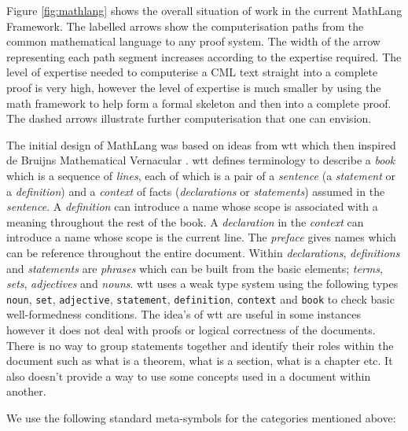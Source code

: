 Figure \ref{fig:mathlang} shows the overall situation of work in the current
MathLang Framework. The labelled arrows show the computerisation paths from the
common mathematical language to any proof system. The width of the arrow
representing each path segment increases according to the expertise required.
The level of expertise needed to computerise a CML text straight into a complete
proof is very high, however the level of expertise is much smaller by using the
\gls{math} framework to help form a formal skeleton and then into a complete
proof. The dashed arrows illustrate further computerisation that one can
envision.

The initial design of MathLang was based on ideas from \gls{wtt} \cite{wtt}
which then inspired de Bruijns Mathematical Vernacular \cite{mv}. \Gls{wtt}
defines terminology to describe a \emph{book} which is a sequence of
\emph{lines}, each of which is a pair of a \emph{sentence} (a \emph{statement}
or a \emph{definition}) and a \emph{context} of facts (\emph{declarations} or
\emph{statements}) assumed in the \emph{sentence}. A \emph{definition} can
introduce a name whose scope is associated with a meaning throughout the rest of
the book. A \emph{declaration} in the \emph{context} can introduce a name whose
scope is the current line. The \emph{preface} gives names which can be reference
throughout the entire document. Within \emph{declarations}, \emph{definitions}
and \emph{statements} are \emph{phrases} which can be built from the basic
elements; \emph{terms}, \emph{sets}, \emph{adjectives} and \emph{nouns}.
\Gls{wtt} uses a weak type system using the following types \texttt{noun},
\texttt{set}, \texttt{adjective}, \texttt{statement}, \texttt{definition},
\texttt{context} and \texttt{book} to check basic well-formedness conditions.
The idea's of \gls{wtt} are useful in some instances however it does not deal
with proofs or logical correctness of the documents. There is no way to group
statements together and identify their roles within the document such as what
is a theorem, what is a section, what is a chapter etc. It also doesn't provide
a way to use some concepts used in a document within another.

We use the following standard meta-symbols for the categories mentioned above:

